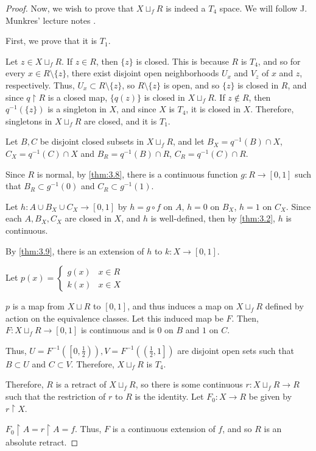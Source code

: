 \documentclass[openany, amssymb, psamsfonts]{amsart}
\let\fullref\autoref
\theoremstyle{definition}
\numberwithin{equation}{section}
\begin{document}
\begin{proof}
  Now, we wish to prove that $X \sqcup_f R$ is indeed a $T_4$ space. We will follow J. Munkres' lecture notes \cite{munkres}.

  First, we prove that it is $T_1$. 

  Let $z \in X \sqcup_f R$. If $z \in R$, then $\{z\}$ is closed. This is because $R$ is $T_4$, and so for every $x \in R \setminus \{z\}$, there exist disjoint open neighborhoods $U_x$ and $V_z$ of $x$ and $z$, respectively. Thus, $U_x \subset R \setminus \{z\}$, so $R \setminus \{z\}$ is open, and so $\{z\}$ is closed in $R$, and since $q\restriction R$ is a closed map, $\{q(z)\}$ is closed in $X \sqcup_f R$. If $z \not\in R$, then $q^{-1}(\{z\})$ is a singleton in $X$, and since $X$ is $T_4$, it is closed in $X$. Therefore, singletons in $X \sqcup_f R$ are closed, and it is $T_1$. 

  Let $B,C$ be disjoint closed subsets in $X \sqcup_f R$, and let $B_X = q^{-1}(B) \cap X$, $C_X = q^{-1}(C) \cap X$ and $B_R = q^{-1}(B) \cap R$, $C_R= q^{-1}(C) \cap R$. 

  Since $R$ is normal, by \fullref{thm:3.8}, there is a continuous function $g: R \to [0,1]$ such that $B_R \subset g^{-1}(0)$ and $C_R \subset g^{-1}(1)$. 

  Let $h: A \cup B_X \cup C_X \to [0,1]$ by $h = g\circ f$ on $A$, $h = 0$ on $B_X$, $h = 1$ on $C_X$. Since each $A, B_X, C_X$ are closed in $X$, and $h$ is well-defined, then by \fullref{thm:3.2}, $h$ is continuous. 

  By \fullref{thm:3.9}, there is an extension of $h$ to $k: X \to [0,1]$. 

  Let $p(x) = \begin{cases}
    g(x) & x \in R\\
    k(x) & x \in X
  \end{cases}$ 

  $p$ is a map from $X \sqcup R$ to $[0,1]$, and thus induces a map on $X\sqcup_f R$ defined by action on the equivalence classes. Let this induced map be $F$. Then, $F: X\sqcup_f R \to [0,1]$ is continuous and is $0$ on $B$ and $1$ on $C$. 

  Thus, $U = F^{-1}\left(\left[0, \frac12\right)\right), V = F^{-1} \left( \left ( \frac12, 1 \right] \right)$ are disjoint open sets such that $B \subset U$ and $C \subset V$. Therefore, $X\sqcup_f R$ is $T_4$. 

  Therefore, $R$ is a retract of $X \sqcup_f R$, so there is some continuous $r: X \sqcup_f R \to R$ such that the restriction of $r$ to $R$ is the identity. Let $F_0: X \to R$ be given by $r \restriction X$. 

  $F_0 \restriction A = r \restriction A = f$. Thus, $F$ is a continuous extension of $f$, and so $R$ is an absolute retract.
\end{proof}
\end{document}
